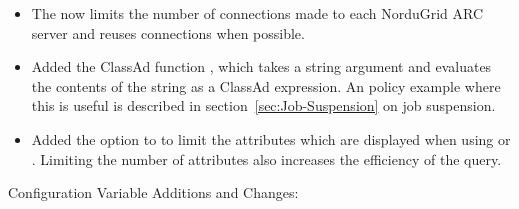 \begin{itemize}
\item The  now limits the number of connections
made to each NorduGrid ARC server and reuses connections when possible.

\item Added the ClassAd function , which takes a string
argument and evaluates the contents of the string as a ClassAd
expression.  An policy example where this is useful is described in
section~\ref{sec:Job-Suspension} on job suspension.

\item Added the option  to  to limit the
attributes which are displayed when using  or .
Limiting the number of attributes also increases the efficiency of
the query.

\end{itemize}

\noindent Configuration Variable Additions and Changes:


